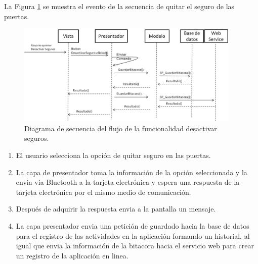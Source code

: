 La Figura \ref{ds7} se muestra el evento de la secuencia de quitar el seguro de las puertas.\\
\begin{figure}[H]
\centering
\includegraphics[width=0.95\textwidth]{metodologia/DSDesactivarSeguros.jpg}
\caption{Diagrama de secuencia del flujo de la funcionalidad desactivar seguros.}
\label{ds7}
\end{figure}
%
 \begin{enumerate}
\item El usuario selecciona la opción de quitar seguro en las puertas.
\item La capa de presentador toma la información de la opción seleccionada y la envia via Bluetooth a la tarjeta electrónica y espera una respuesta de la tarjeta electrónica por el mismo medio de comunicación.
\item Después de adquirir la respuesta envia a la pantalla un mensaje.
\item La capa presentador envia una petición de guardado hacia la base de datos para el registro de las actividades en la aplicación formando un historial, al igual que envia la información de la bitacora hacia el servicio web para crear un registro de la aplicación en linea.
\end{enumerate}


